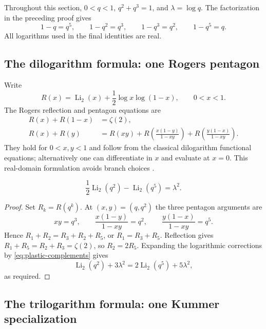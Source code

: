 Throughout this section, $0<q<1$, $q^2+q^3=1$, and
$\lambda=\log q$.  The factorization in the preceding proof gives
\begin{equation}
1-q=q^5,\qquad1-q^2=q^3,\qquad
1-q^3=q^2,\qquad1-q^5=q.
\label{eq:plastic-complements}
\end{equation}
All logarithms used in the final identities are real.

\subsection{The dilogarithm formula: one Rogers pentagon}

Write
\[
R(x)=\operatorname{Li}_2(x)+\frac12\log x\log(1-x),
\qquad 0<x<1.
\]
The Rogers reflection and pentagon equations are
\begin{align}
R(x)+R(1-x)&=\zeta(2),\label{eq:plastic-R-reflect}\\
R(x)+R(y)&=R(xy)
 +R\!\left(\frac{x(1-y)}{1-xy}\right)
 +R\!\left(\frac{y(1-x)}{1-xy}\right).
\label{eq:plastic-R-pentagon}
\end{align}
They hold for $0<x,y<1$ and follow from the classical dilogarithm
functional equations; alternatively one can differentiate in $x$
and evaluate at $x=0$.  This real-domain formulation avoids branch
choices \cite{ZagierPolylogs1991}.

\begin{theorem}
\label{thm:plastic-dilog}
\begin{equation}
\frac12\operatorname{Li}_2(q^2)-\operatorname{Li}_2(q^5)
=\lambda^2.
\label{eq:plastic-dilog-proved}
\end{equation}
\end{theorem}

\begin{proof}
Set $R_k=R(q^k)$.  At $(x,y)=(q,q^2)$ the three pentagon
arguments are
\[
xy=q^3,\qquad
\frac{x(1-y)}{1-xy}=q^2,\qquad
\frac{y(1-x)}{1-xy}=q^5.
\]
Hence $R_1+R_2=R_3+R_2+R_5$, or $R_1=R_3+R_5$.
Reflection gives $R_1+R_5=R_2+R_3=\zeta(2)$, so
$R_2=2R_5$.  Expanding the logarithmic corrections by
\eqref{eq:plastic-complements} gives
\[
\operatorname{Li}_2(q^2)+3\lambda^2
=2\operatorname{Li}_2(q^5)+5\lambda^2,
\]
as required.
\end{proof}

\subsection{The trilogarithm formula: one Kummer specialization}

